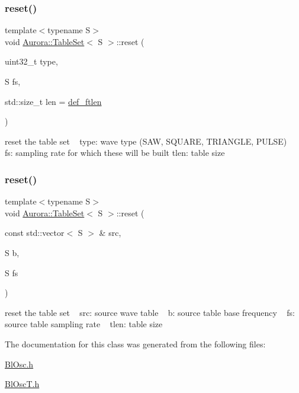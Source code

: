 \subsubsection{\texorpdfstring{reset()}{reset()}\hspace{0.1cm}{\footnotesize\ttfamily [3/4]}}
{\footnotesize\ttfamily template$<$typename S$>$ \\
void \hyperlink{class_aurora_1_1_table_set}{Aurora\+::\+Table\+Set}$<$ S $>$\+::reset (\begin{DoxyParamCaption}\item[{uint32\+\_\+t}]{type,  }\item[{S}]{fs,  }\item[{std\+::size\+\_\+t}]{len = {\ttfamily \hyperlink{namespace_aurora_a14dabfd9feedfa09c0e6f86d2627f006}{def\+\_\+ftlen}} }\end{DoxyParamCaption})\hspace{0.3cm}{\ttfamily [inline]}}

reset the table set ~\newline
type\+: wave type (S\+AW, S\+Q\+U\+A\+RE, T\+R\+I\+A\+N\+G\+LE, P\+U\+L\+SE) ~\newline
fs\+: sampling rate for which these will be built tlen\+: table size \mbox{\label{class_aurora_1_1_table_set_afec852dca45285ec57b6a4a97dffac36}} 
\subsubsection{\texorpdfstring{reset()}{reset()}\hspace{0.1cm}{\footnotesize\ttfamily [4/4]}}
{\footnotesize\ttfamily template$<$typename S$>$ \\
void \hyperlink{class_aurora_1_1_table_set}{Aurora\+::\+Table\+Set}$<$ S $>$\+::reset (\begin{DoxyParamCaption}\item[{const std\+::vector$<$ S $>$ \&}]{src,  }\item[{S}]{b,  }\item[{S}]{fs }\end{DoxyParamCaption})\hspace{0.3cm}{\ttfamily [inline]}}

reset the table set ~\newline
src\+: source wave table ~\newline
b\+: source table base frequency ~\newline
fs\+: source table sampling rate ~\newline
tlen\+: table size 

The documentation for this class was generated from the following files\+:\begin{DoxyCompactItemize}
\item 
\hyperlink{_bl_osc_8h}{Bl\+Osc.\+h}\item 
\hyperlink{_bl_osc_t_8h}{Bl\+Osc\+T.\+h}\end{DoxyCompactItemize}
